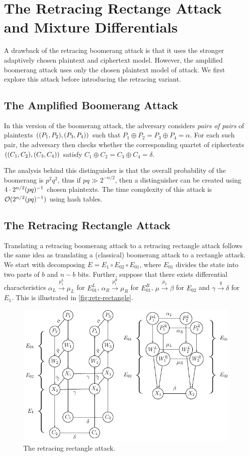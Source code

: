 \documentclass[notheorems]{beamer}
\theoremstyle{definition}
\theoremstyle{example}
\begin{document}
    \section{The Retracing Rectange Attack and Mixture Differentials}

A drawback of the retracing boomerang attack is that it uses the stronger
adaptively chosen plaintext and ciphertext model. However, the amplified
boomerang attack uses only the chosen plaintext model of attack. We first
explore this attack before introducing the retracing variant.

\subsection{The Amplified Boomerang Attack}

In this version of the boomerang attack, the adversary considers \emph{pairs of
pairs} of plaintexts \(((P_1, P_2), (P_3, P_4))\) such that \(P_1
\oplus P_2 = P_3 \oplus P_4 = \alpha\). For each such pair, the adversary then
checks whether the corresponding quartet of ciphertexts \(((C_1, C_2),
(C_3, C_4))\) satisfy \(C_1 \oplus C_2 = C_3 \oplus C_4 = \delta\).

The analysis behind this distinguisher is that the overall probability of the
boomerang is \(p^2q^2\), thus if \(pq \gg 2^{-n/2}\), then a distinguisher can
be created using \(4 \cdot 2^{n/2}(pq)^{-1}\) chosen plaintexts. The time
complexity of this attack is \(\mathcal O(2^{n/2}(pq)^{-1})\) using hash
tables.

\subsection{The Retracing Rectangle Attack}

Translating a retracing boomerang attack to a retracing rectangle attack follows
the same idea as translating a (classical) boomerang attack to a rectangle
attack. We start with decomposing \(E = E_1 \circ E_{02} \circ E_{01}\), where
\(E_{01}\) divides the state into two parts of \(b\) and \(n - b\) bits.
Further, suppose that there exists differential characteristics \(\alpha_L
\xrightarrow{p_1^L} \mu_L\) for \(E_{01}^L\), \(\alpha_R \xrightarrow{p_1^R}
\mu_R\) for \(E_{01}^R\), \(\mu \xrightarrow{p_2} \beta\) for \(E_{02}\) and
\(\gamma \xrightarrow{q} \delta\) for \(E_1\). This is illustrated in
\autoref{fig:retr-rectangle}.

\begin{figure}
    \centering
    \includegraphics[width=0.6\columnwidth]{images/retracing_rectangle.png}
    \caption{The retracing rectangle attack.}
    \label{fig:retr-rectangle}
\end{figure}
\end{document}
